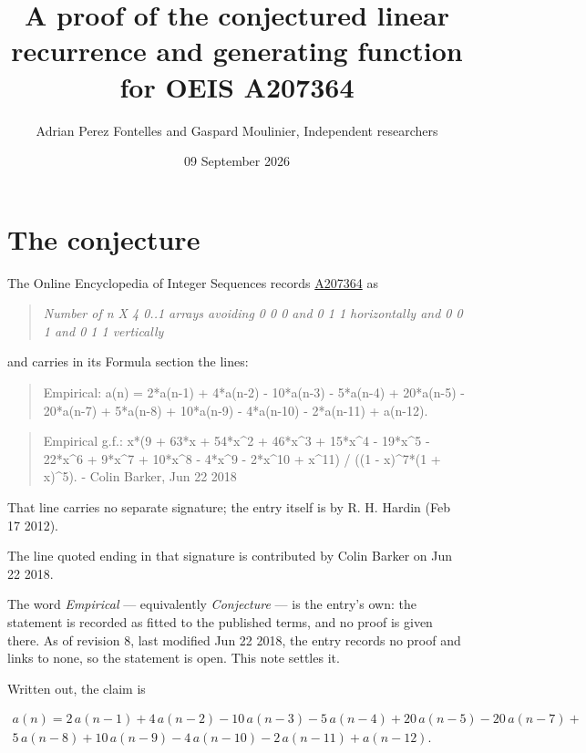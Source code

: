 \documentclass[11pt]{article}
\title{A proof of the conjectured linear recurrence and generating function for OEIS A207364}
\author{Adrian Perez Fontelles and Gaspard Moulinier, Independent researchers}
\date{09 September 2026}
\theoremstyle{definition}
\begin{document}
\maketitle
\section{The conjecture}

The Online Encyclopedia of Integer Sequences records \href{https://oeis.org/A207364}{A207364} as

\begin{quote}\itshape Number of n X 4 0..1 arrays avoiding 0 0 0 and 0 1 1 horizontally and 0 0 1 and 0 1 1 vertically\end{quote}

and carries in its Formula section the lines:

\begin{quote}\ttfamily Empirical: a(n) = 2*a(n-1) + 4*a(n-2) - 10*a(n-3) - 5*a(n-4) + 20*a(n-5) - 20*a(n-7) + 5*a(n-8) + 10*a(n-9) - 4*a(n-10) - 2*a(n-11) + a(n-12).\end{quote}

\begin{quote}\ttfamily Empirical g.f.: x*(9 + 63*x + 54*x\textasciicircum{}2 + 46*x\textasciicircum{}3 + 15*x\textasciicircum{}4 - 19*x\textasciicircum{}5 - 22*x\textasciicircum{}6 + 9*x\textasciicircum{}7 + 10*x\textasciicircum{}8 - 4*x\textasciicircum{}9 - 2*x\textasciicircum{}10 + x\textasciicircum{}11) / ((1 - x)\textasciicircum{}7*(1 + x)\textasciicircum{}5). - Colin Barker, Jun 22 2018\end{quote}

That line carries no separate signature; the entry itself is by R. H. Hardin (Feb 17 2012).

The line quoted ending in that signature is contributed by Colin Barker on Jun 22 2018.

The word {\itshape Empirical} --- equivalently {\itshape Conjecture} --- is the entry's own: the statement is recorded as fitted to the published terms, and no proof is given there. As of revision 8, last modified Jun 22 2018, the entry records no proof and links to none, so the statement is open. This note settles it.

Written out, the claim is

\begin{multline*} a(n) = 2\,a(n-1) + 4\,a(n-2) - 10\,a(n-3) - 5\,a(n-4) + 20\,a(n-5) - 20\,a(n-7) + \\ 5\,a(n-8) + 10\,a(n-9) - 4\,a(n-10) - 2\,a(n-11) + a(n-12). \end{multline*}
\end{document}
